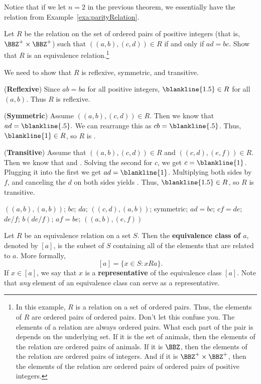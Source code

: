 Notice that if we let $n=2$ in the previous theorem, 
we essentially have the relation from Example~\ref{exa:parityRelation}.

\begin{fib}
 Let $R$ be the relation on the set of ordered pairs of positive integers (that is, $\BBZ^+\times\BBZ^+$)
such that $( (a,b), (c,d) ) \in R$ if and only if $ad=bc$.
Show that $R$ is an equivalence relation.\footnote{In this example, $R$ is a relation on
a set of ordered pairs.  Thus, the elements of $R$ are ordered pairs of ordered pairs.  
Don't let this confuse you.  The elements of a relation are always ordered pairs.
What each part of the pair is depends on the underlying set.  If it is the set of animals, then the elements
of the relation are ordered pairs of animals.  If it is $\BBZ$, then the elements of the relation are
ordered pairs of integers.  And if it is $\BBZ^+\times\BBZ^+$, then the elements of the relation are
ordered pairs of ordered pairs of positive integers.
}
\begin{pf}
We need to show that $R$ is reflexive, symmetric, and transitive.

\noindent
({\bf Reflexive})
Since $ab=ba$ for all positive integers, $\blankline{1.5} \in R$ for all
$(a,b)$.  Thus $R$ is reflexive.

\noindent
({\bf Symmetric})
Assume  $( (a,b),(c,d) ) \in R$.  Then we know that $ad=\blankline{.5}.$
We can rearrange this as $cb=\blankline{.5}$.
Thus,  $\blankline{1}\in R$, so $R$ is .

\noindent
({\bf Transitive})
Assume that $( (a,b),(c,d)) \in R$ and $( (c,d),(e,f) ) \in R$.  
Then we know that  and .
Solving the second for $c$, we get $c=\blankline{1}$.
Plugging it into the first we get $ad=\blankline{1}$.  
Multiplying both sides by $f$, and canceling the $d$ on both sides yields
.  
Thus, $\blankline{1.5} \in R$, so $R$ is transitive.
\end{pf}
\begin{answer}
$( (a,b), (a,b))$;
$bc$;
$da$;
$((c,d),(a,b))$;
symmetric;
$ad=bc$; 
$cf=de$;
$de/f$;
$b(de/f)$;
$af=be$;
$( (a,b),(e,f) )$
\end{answer}
\end{fib}

\begin{df}
Let $R$ be an equivalence relation on a set $S$. Then
the {\bf equivalence class of \boldmath$a$}, denoted by \boldmath$[a]$\unboldmath, is the subset of $S$ 
containing all of the elements that are related to $a$.
More formally, 
$$[a] = \{x\in S: x R a\}.$$
If $x\in[a]$, we say that $x$ is a {\bf representative} of the equivalence class $[a]$.
Note that {\em any} element of an equivalence class can serve as a representative.
\end{df}

